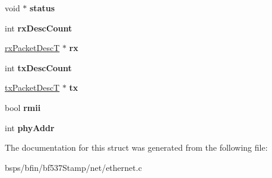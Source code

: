 \begin{DoxyCompactItemize}
\mbox{\label{structbfin__ethernetSoftc_aaf35fb210c4432202a949f0348393389}} 
void $\ast$ {\bfseries status}
\item 
\mbox{\label{structbfin__ethernetSoftc_a11170a73c029ca77d02b4a18bb870db2}} 
int {\bfseries rx\+Desc\+Count}
\item 
\mbox{\label{structbfin__ethernetSoftc_a93f521e73992f0861515fecbe2769a51}} 
\mbox{\hyperlink{structrxPacketDescT}{rx\+Packet\+DescT}} $\ast$ {\bfseries rx}
\item 
\mbox{\label{structbfin__ethernetSoftc_afac9712b7ed86e8cd260e2f88d3edfeb}} 
int {\bfseries tx\+Desc\+Count}
\item 
\mbox{\label{structbfin__ethernetSoftc_a20a01448f521ce1144afbc9f40d6ecd1}} 
\mbox{\hyperlink{structtxPacketDescT}{tx\+Packet\+DescT}} $\ast$ {\bfseries tx}
\item 
\mbox{\label{structbfin__ethernetSoftc_a82f4d2b131b698ebd89b574c319ebd5e}} 
bool {\bfseries rmii}
\item 
\mbox{\label{structbfin__ethernetSoftc_a15b2119a48a824cc3aa3d440951fdeaf}} 
int {\bfseries phy\+Addr}
\end{DoxyCompactItemize}


The documentation for this struct was generated from the following file\+:\begin{DoxyCompactItemize}
\item 
bsps/bfin/bf537\+Stamp/net/ethernet.\+c\end{DoxyCompactItemize}
